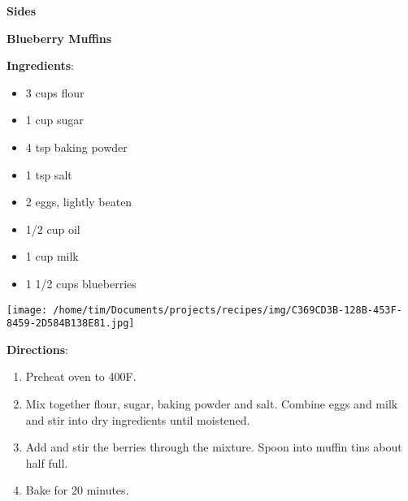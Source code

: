 \documentclass[11pt, twoside, openany]{book}
\begin{document}
{\newpage \LARGE \textbf{Sides}} \label{sides}\\
\noindent\begin{minipage}[t]{\linewidth}%
{\Large\textbf{Blueberry Muffins}} \label{blueberry-muffins}\hfill\textit{}\\
\noindent\begin{minipage}[t]{0.78\linewidth}%
\textbf{Ingredients}:\vspace{-3mm}
\begin{multicols}{2}
\begin{itemize}\setlength\itemsep{-1mm}
\item 3 cups flour
\item 1 cup sugar
\item 4 tsp baking powder
\item 1 tsp salt
\item 2 eggs, lightly beaten
\item 1/2 cup oil
\item 1 cup milk
\item 1 1/2 cups blueberries
\end{itemize}
\end{multicols}
\end{minipage}
\noindent\begin{minipage}[t]{0.18\linewidth}
\centering \strut\vspace*{-\baselineskip}\newline
\texttt{[image: /home/tim/Documents/projects/recipes/img/C369CD3B-128B-453F-8459-2D584B138E81.jpg]}\\
\end{minipage}\vspace{3mm}
\textbf{Directions}:
\vspace{-3mm}\begin{enumerate}\setlength\itemsep{-1mm}
\item Preheat oven to 400F.
\item Mix together flour, sugar, baking powder and salt. Combine eggs and milk and stir into dry ingredients until moistened.
\item Add and stir the berries through the mixture. Spoon into muffin tins about half full.
\item Bake for 20 minutes.
\end{enumerate}
\end{minipage}\vspace{8mm}
\end{document}
